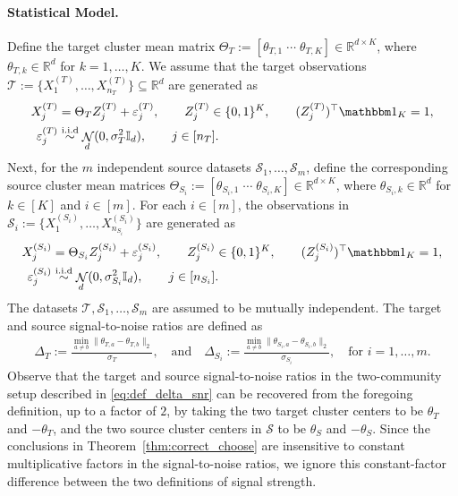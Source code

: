 \documentclass[10pt]{article}
\newcommand{\R}{\mathbb R}
\newcommand{\simiid}{\overset{\mathrm{i.i.d}}{\sim}}
\newcommand{\Id}{\mathbb I}
\DeclareMathOperator{\dnorm}{\mathcal N}
\newcommand{\calT}{\mathcal T}
\newcommand{\trg}{T}
\newcommand{\thetaT}{\theta_{\trg}}
\newcommand{\nT}{n_{\trg}}
\newcommand{\sigmaT}{\sigma_{\trg}}
\newcommand{\Xtar}{X^{(\trg)}}
\newcommand{\Ztar}{Z^{(\trg)}}
\newcommand{\thetamcT}[1]{\theta_{\trg,#1}}
\newcommand{\ThetaT}{\Theta_{\trg}}
\newcommand{\ept}{\varepsilon^{(\trg)}}
\newcommand{\DeltaT}{\Delta_{\trg}}
\newcommand{\calS}{\mathcal S}
\newcommand{\src}{S}
\newcommand{\thetaS}{\theta_{\src}}
\newcommand{\nSm}[1]{n_{\src_{#1}}}
\newcommand{\sigmaSm}[1]{\sigma_{\src_{#1}}}
\newcommand{\Xsrcm}[1]{X^{(\src_{#1})}}
\newcommand{\Zsrcm}[1]{Z^{(\src_{#1})}}
\newcommand{\thetamSS}[2]{\theta_{\src_{#1},#2}}
\newcommand{\ThetamS}[1]{\Theta_{\src_{#1}}}
\newcommand{\epsm}[1]{\varepsilon^{(\src_{#1})}}
\newcommand{\DeltaSm}[1]{\Delta_{\src_{#1}}}
\begin{document}
\paragraph{Statistical Model.}
Define the target cluster mean matrix
$\ThetaT:=[\thetamcT{1}\; \cdots \; \thetamcT{K}] \in \R^{d\times K}$, where $\thetamcT{k} \in \R^d$ for $k=1,\ldots,K$. We assume that the target observations $\calT:=\{\Xtar_1,\ldots,\Xtar_{\nT}\}\subseteq \R^d$ are generated as
\begin{align}
\label{eq:mult_clust_target_sample}
    \Xtar_j &= \ThetaT\Ztar_j+\ept_j,
    \qquad \Ztar_j\in\{0,1\}^K,\qquad (\Ztar_j)^\top \mathbbm 1_K=1,\\
    \ept_j &\simiid \dnorm_d(0,\sigmaT^2 \Id_d),
    \qquad j \in [\nT].
\end{align}
Next, for the $m$ independent source datasets
$\calS_1,\ldots,\calS_m$, define the corresponding source cluster mean matrices
$\ThetamS{i}:=[\thetamSS{i}{1}\; \cdots \; \thetamSS{i}{K}]\in \R^{d\times K}$, where $\thetamSS{i}{k}\in \R^d$ for $k \in [K]$ and $i \in [m]$. For each $i\in [m]$, the observations in
$\calS_i:=\{\Xsrcm{i}_1,\ldots,\Xsrcm{i}_{\nSm{i}}\}$ are generated as
\begin{align}
\label{eq:mult_clust_source_sample}
    \Xsrcm{i}_j &= \ThetamS{i}\Zsrcm{i}_j+\epsm{i}_j,
    \qquad \Zsrcm{i}_j\in\{0,1\}^K,\qquad (\Zsrcm{i}_j)^\top \mathbbm 1_K=1,\\
    \epsm{i}_j &\simiid \dnorm_d(0,\sigmaSm{i}^2 \Id_d),
    \qquad j \in [\nSm{i}].
\end{align}
The datasets $\calT,\calS_1,\ldots,\calS_m$ are assumed to be mutually independent. The target and source signal-to-noise ratios are defined as
\begin{align}
\label{eq:def_delta_multi_snr}
    \DeltaT:=\frac{\min_{a\neq b}\|\thetamcT{a}-\thetamcT{b}\|_2}{\sigmaT},
    \quad \mbox{and} \quad
    \DeltaSm{i}:=\frac{\min_{a\neq b}\|\thetamSS{i}{a}-\thetamSS{i}{b}\|_2}{\sigmaSm{i}},
    \quad \mbox{for $i=1,\ldots,m$.}
\end{align}
Observe that the target and source signal-to-noise ratios in the
two-community setup described in \eqref{eq:def_delta_snr} can be recovered from the foregoing definition, up to a factor of $2$, by taking the two target cluster centers to be $\thetaT$ and $-\thetaT$, and the two source cluster centers in $\calS$ to be $\thetaS$ and $-\thetaS$. 
Since the conclusions in Theorem~\ref{thm:correct_choose} are insensitive to constant multiplicative factors in the signal-to-noise ratios, we ignore this constant-factor difference between the two definitions of signal strength.
\end{document}
